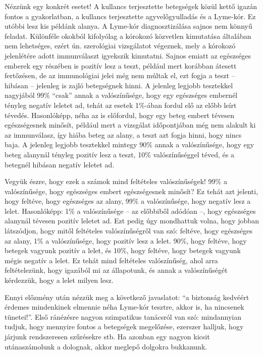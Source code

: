 \documentclass[magyar,]{book}
\begin{document}
Nézzünk egy konkrét esetet! A kullancs terjesztette betegségek közül kettő igazán fontos a gyakorlatban, a kullancs terjesztette agyvelőgyulladás és a Lyme-kór. Ez utóbbi lesz kis példánk alanya. A Lyme-kór diagnosztizálása sajnos nem könnyű feladat. Különféle okokból kifolyólag a kórokozó közvetlen kimutatása általában nem lehetséges, ezért ún. szerológiai vizsgálatot végeznek, mely a kórokozó jelenlétére adott immunválaszt igyekszik kimutatni. Sajnos emiatt az egészséges emberek egy részében is pozitív lesz a teszt, például mert korábban átesett fertőzésen, de az immunológiai jelei még nem múltak el, ezt fogja a teszt -- hibásan -- jelenleg is zajló betegségnek hinni. A jelenleg legjobb tesztekkel nagyjából 99\% \enquote{csak} annak a valószínűsége, hogy egy egészséges embernél tényleg negatív leletet ad, tehát az esetek 1\%-ában fordul elő az előbb leírt tévedés. Hasonlóképp, néha az is előfordul, hogy egy beteg embert tévesen egészségesnek minősít, például mert a vizsgálat időpontjában még nem alakult ki az immunválasz, így hiába beteg az alany, a teszt azt fogja hinni, hogy nincs baja. A jelenleg legjobb tesztekkel mintegy 90\% annak a valószínűsége, hogy egy beteg alanynál tényleg pozitív lesz a teszt, 10\% valószínűséggel téved, és a betegnél hibásan negatív leletet ad.

Vegyük észre, hogy ezek a számok mind feltételes valószínűségek! 99\% a valószínűsége, hogy egészséges embert egészségesnek minősít? Ez tehát azt jelenti, hogy feltéve, hogy egészséges az alany, 99\% a valószínűsége, hogy negatív lesz a lelet. Hasonlóképp: 1\% a valószínűsége -- az előbbiből adódóan --, hogy egészséges alanynál tévesen pozitív leletet ad. Ezt pedig úgy mondhattuk volna, hogy jobban látszódjon, hogy mitől feltételes valószínűségről van szó: feltéve, hogy egészséges az alany, 1\% a valószínűsége, hogy pozitív lesz a lelet. 90\%, hogy feltéve, hogy betegek vagyunk pozitív a lelet, és 10\%, hogy feltéve, hogy betegek vagyunk mégis negatív a lelet. Ez tehát mind feltételes valószínűség, ahol arra feltételezünk, hogy igazából mi az állapotunk, és annak a valószínűségét kérdezzük, hogy a lelet milyen lesz.

Ennyi előzmény után nézzük meg a következő javaslatot: \enquote{a biztonság kedvéért érdemes mindenkinek elmennie néha Lyme-kór tesztre, akkor is, ha nincsenek tünetei!}. Első ránézésre nagyon szimpatikus tanácsról van szó: mindannyian tudjuk, hogy mennyire fontos a betegségek megelőzése, ezerszer halljuk, hogy járjunk rendszeresen szűrésekre stb. Ha azonban egy nagyon kicsit utánaszámolunk a dolognak, akkor meglepő dolgokra bukkanunk.
\end{document}

